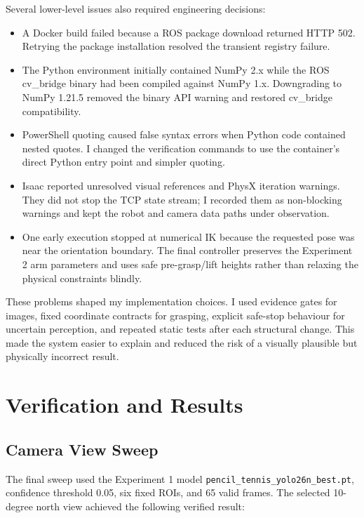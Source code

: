 \documentclass[12pt,a4paper]{article}
\begin{document}
Several lower-level issues also required engineering decisions:
\begin{itemize}
  \item A Docker build failed because a ROS package download returned HTTP 502. Retrying the package installation resolved the transient registry failure.
  \item The Python environment initially contained NumPy 2.x while the ROS cv\_bridge binary had been compiled against NumPy 1.x. Downgrading to NumPy 1.21.5 removed the binary API warning and restored cv\_bridge compatibility.
  \item PowerShell quoting caused false syntax errors when Python code contained nested quotes. I changed the verification commands to use the container's direct Python entry point and simpler quoting.
  \item Isaac reported unresolved visual references and PhysX iteration warnings. They did not stop the TCP state stream; I recorded them as non-blocking warnings and kept the robot and camera data paths under observation.
  \item One early execution stopped at numerical IK because the requested pose was near the orientation boundary. The final controller preserves the Experiment 2 arm parameters and uses safe pre-grasp/lift heights rather than relaxing the physical constraints blindly.
\end{itemize}

These problems shaped my implementation choices. I used evidence gates for images, fixed coordinate contracts for grasping, explicit safe-stop behaviour for uncertain perception, and repeated static tests after each structural change. This made the system easier to explain and reduced the risk of a visually plausible but physically incorrect result.

\section{Verification and Results}

\subsection{Camera View Sweep}

The final sweep used the Experiment 1 model \texttt{pencil\_tennis\_yolo26n\_best.pt}, confidence threshold 0.05, six fixed ROIs, and 65 valid frames. The selected 10-degree north view achieved the following verified result:
\end{document}
